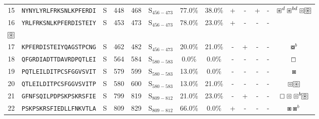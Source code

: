 \begin{tabular}{rcccccccccccc}
15 &  \texttt{NYNYLYRLFRKSNLKPFERDI} &       S &    448 &   468 &  S$_{456-473}$ &                          77.0\% &                           38.0\% &          + &           - &          + &           - &                            $ \boxast^d \boxast^{bd} \boxcircle \setlength{\fboxsep}{0.5pt} \boxed{\circledast} $ \\
16 &  \texttt{YRLFRKSNLKPFERDISTEIY} &       S &    453 &   473 &  S$_{456-473}$ &                          78.0\% &                           23.0\% &          + &           - &          - &           - &  \Centerstack{  $\boxempty \boxast \boxast^b \boxcircle$ \\  $\setlength{\fboxsep}{0.5pt} \boxed{\circledast}$ } \\
17 &  \texttt{KPFERDISTEIYQAGSTPCNG} &       S &    462 &   482 &  S$_{456-473}$ &                          20.0\% &                           21.0\% &          - &           + &          - &           - &                                                                                                 $ \boxcircle^b $ \\
18 &  \texttt{QFGRDIADTTDAVRDPQTLEI} &       S &    564 &   584 &  S$_{580-583}$ &                           0.0\% &                            0.0\% &          - &           - &          - &           - &                                                                                                    $ \boxempty $ \\
19 &  \texttt{PQTLEILDITPCSFGGVSVIT} &       S &    579 &   599 &  S$_{580-583}$ &                          13.0\% &                            0.0\% &          - &           - &          - &           - &                                                                                                      $ \boxast $ \\
20 &  \texttt{QTLEILDITPCSFGGVSVITP} &       S &    580 &   600 &  S$_{580-583}$ &                          13.0\% &                           21.0\% &          - &           - &          - &           - &                                                   $ \boxcircle \setlength{\fboxsep}{0.5pt} \boxed{\circledast} $ \\
21 &  \texttt{GFNFSQILPDPSKPSKRSFIE} &       S &    799 &   819 &  S$_{809-812}$ &                          21.0\% &                           23.0\% &          - &           + &          - &           - &                            $ \boxempty \boxcircle \boxcircle^b \setlength{\fboxsep}{0.5pt} \boxed{\circledast} $ \\
22 &  \texttt{PSKPSKRSFIEDLLFNKVTLA} &       S &    809 &   829 &  S$_{809-812}$ &                          66.0\% &                            0.0\% &          + &           - &          - &           - &                                                                                            $ \boxast \boxast^b $ \\
\bottomrule
\end{tabular}
